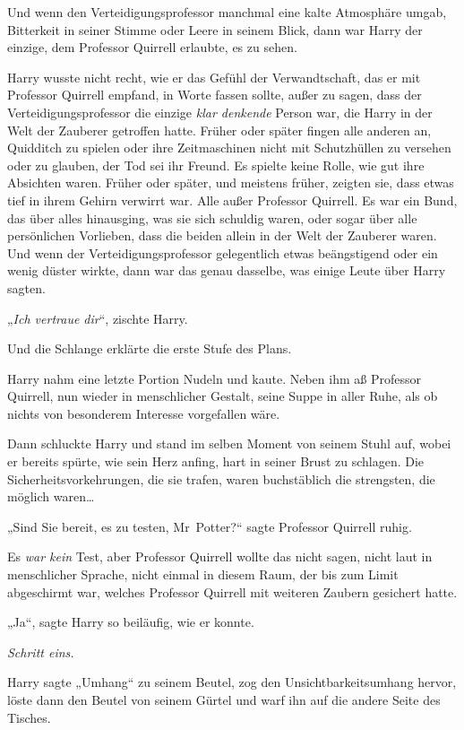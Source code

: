 {Und wenn den Verteidigungsprofessor manchmal eine kalte Atmosphäre umgab, Bitterkeit in seiner Stimme oder Leere in seinem Blick, dann war Harry der einzige, dem Professor Quirrell erlaubte, es zu sehen.

Harry wusste nicht recht, wie er das Gefühl der Verwandtschaft, das er mit Professor Quirrell empfand, in Worte fassen sollte, außer zu sagen, dass der Verteidigungsprofessor die einzige \emph{klar denkende} Person war, die Harry in der Welt der Zauberer getroffen hatte. Früher oder später fingen alle anderen an, Quidditch zu spielen oder ihre Zeitmaschinen nicht mit Schutzhüllen zu versehen oder zu glauben, der Tod sei ihr Freund. Es spielte keine Rolle, wie gut ihre Absichten waren. Früher oder später, und meistens früher, zeigten sie, dass etwas tief in ihrem Gehirn verwirrt war. Alle außer Professor Quirrell. Es war ein Bund, das über alles hinausging, was sie sich schuldig waren, oder sogar über alle persönlichen Vorlieben, dass die beiden allein in der Welt der Zauberer waren. Und wenn der Verteidigungsprofessor gelegentlich etwas beängstigend oder ein wenig düster wirkte, dann war das genau dasselbe, was einige Leute über Harry sagten.

„\emph{Ich vertraue dir}“, zischte Harry.

Und die Schlange erklärte die erste Stufe des Plans.

Harry nahm eine letzte Portion Nudeln und kaute. Neben ihm aß Professor Quirrell, nun wieder in menschlicher Gestalt, seine Suppe in aller Ruhe, als ob nichts von besonderem Interesse vorgefallen wäre.

Dann schluckte Harry und stand im selben Moment von seinem Stuhl auf, wobei er bereits spürte, wie sein Herz anfing, hart in seiner Brust zu schlagen. Die Sicherheitsvorkehrungen, die sie trafen, waren buchstäblich die strengsten, die möglich waren…

„Sind Sie bereit, es zu testen, Mr~Potter?“ sagte Professor Quirrell ruhig.

Es \emph{war kein} Test, aber Professor Quirrell wollte das nicht sagen, nicht laut in menschlicher Sprache, nicht einmal in diesem Raum, der bis zum Limit abgeschirmt war, welches Professor Quirrell mit weiteren Zaubern gesichert hatte.

„Ja“, sagte Harry so beiläufig, wie er konnte.

\emph{Schritt eins.}

Harry sagte „Umhang“ zu seinem Beutel, zog den Unsichtbarkeitsumhang hervor, löste dann den Beutel von seinem Gürtel und warf ihn auf die andere Seite des Tisches.

}
